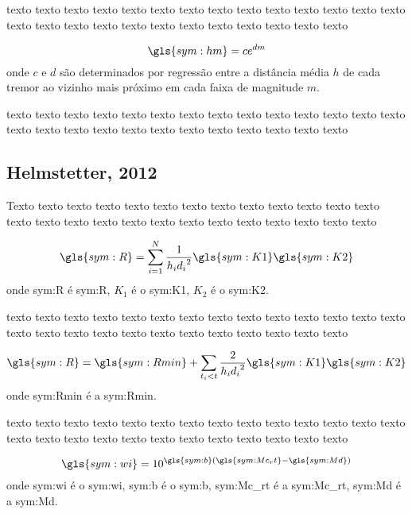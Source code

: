 texto texto texto texto texto texto texto texto texto texto texto texto texto
texto texto texto texto texto texto texto texto texto texto texto texto texto


\begin{equation}
	\ensuremath{
		\gls{sym:hm} = ce^{dm}
	}
	\label{eq:krm2}
\end{equation}
onde $c$ e $d$ são determinados por regressão entre a 
distância média $h$ de cada tremor ao vizinho mais próximo em cada faixa de magnitude $m$.


texto texto texto texto texto texto texto texto texto texto texto texto texto
texto texto texto texto texto texto texto texto texto texto texto texto texto




\subsection{Helmstetter, 2012}
\label{sec:helmstetter}

Texto texto texto texto texto texto texto texto texto texto texto texto texto
texto texto texto texto texto texto texto texto texto texto texto texto texto

\begin{equation}
	\ensuremath{\gls{sym:R} = \sum_{i=1}^{N}{ \frac{1}{h_i {d_i}^2} \gls{sym:K1}\gls{sym:K2} }}
	\label{eq:helms01}
\end{equation}
onde \gls{sym:R} é \glsdesc{sym:R}, 
	  $K_1$ é o \glsdesc{sym:K1}, 
	  $K_2$ é o \glsdesc{sym:K2}.


texto texto texto texto texto texto texto texto texto texto texto texto texto
texto texto texto texto texto texto texto texto texto texto texto texto texto

\begin{equation}
\ensuremath{\gls{sym:R} = \gls{sym:Rmin} + \sum_{t_i < t}{ \frac{2}{h_i {d_i}^2} \gls{sym:K1}\gls{sym:K2} }}
	\label{eq:helms02}
\end{equation}
onde \gls{sym:Rmin} é a \glsdesc{sym:Rmin}.

texto texto texto texto texto texto texto texto texto texto texto texto texto
texto texto texto texto texto texto texto texto texto texto texto texto texto

\begin{equation}
	\ensuremath{ \gls{sym:wi} = 10^{ \gls{sym:b} \left( \gls{sym:Mc_rt} - \gls{sym:Md} \right) } }
	\label{eq:helms_wi}
\end{equation}
onde  \gls{sym:wi} é o \glsdesc{sym:wi}, 
	  \gls{sym:b} é o \glsdesc{sym:b}, 
	  \gls{sym:Mc_rt} é a \glsdesc{sym:Mc_rt}, 
	  \gls{sym:Md} é a \glsdesc{sym:Md}.

